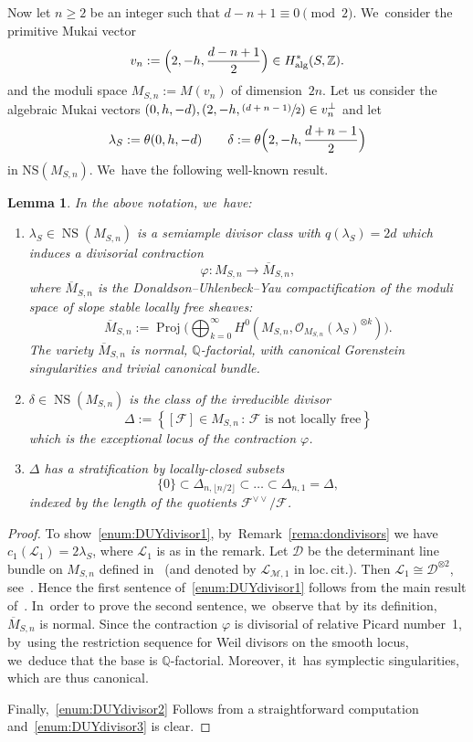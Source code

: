 \documentclass[JEP,XML,SOM,Unicode,published]{cedram}
\newenvironment{enumeratea}
{\bgroup\def\theenumi{\alph{enumi}}\begin{enumerate}}
{\end{enumerate}\egroup}
\newcommand{\psfrac}[2]{\sfrac{(#1)}{#2}}
\newcommand{\QQ}{{\mathbb Q}}\let\Q\QQ
\newcommand{\ZZ}{{\mathbb Z}}\let\Z\ZZ
\newcommand\cD{\mathcal{D}}
\newcommand\cF{\mathcal{F}}
\newcommand\cL{\mathcal{L}}
\newcommand\cM{\mathcal{M}}
\newcommand\cO{\mathcal{O}}
\DeclareMathOperator{\NS}{NS}
\DeclareMathOperator{\Proj}{Proj}
\let\phi\varphi
\newtheorem{lemm}{Lemma}[section]
\theoremstyle{definition}
\begin{document}
Now let $n\geq2$ be an integer such that $d-n+1\equiv 0 \pmod 2$. We~consider the primitive Mukai vector
\begin{equation*}
v_n:=\Bigl(2,-h,\frac{d-n+1}{2}\Bigr)\in H^{*}_\mathrm{alg}(S,\ZZ).
\end{equation*}
and the moduli space $M_{S,n}:=M(v_n)$ of dimension~$2n$.
Let us consider the algebraic Mukai vectors $(0,h,-d),(2,-h,\psfrac{d+n-1}{2})\in v_n^\perp$ and let
\begin{equation}\label{lamdel}
\lambda_S := \theta(0,h,-d) \qquad
\delta:=\theta\Bigl(2,-h,\frac{d+n-1}{2}\Bigr)
\end{equation}
in $\mathrm{NS}(M_{S,n})$. We~have the following well-known result.

\begin{lemm}\label{lem:DUYdivisor}
In the above notation, we~have:
\begin{enumeratea}
\item\label{enum:DUYdivisor1} $\lambda_S\in\NS(M_{S,n})$ is a semiample divisor class with $q(\lambda_S)=2d$ which induces a divisorial contraction
\[
\phi\colon M_{S,n} \to \overline{M}_{S,n},
\]
where $\overline{M}_{S,n}$ is the Donaldson--Uhlenbeck--Yau compactification of the moduli space of slope stable locally free sheaves:
\[
\overline{M}_{S,n}:=\Proj\biggl(\bigoplus_{k=0}^{\infty} H^0(M_{S,n},\cO_{M_{S,n}}(\lambda_S)^{\otimes k})\biggr).
\]
The variety $\overline{M}_{S,n}$ is normal, $\QQ$-factorial, with canonical Gorenstein singularities and trivial canonical bundle.
\item\label{enum:DUYdivisor2} $\delta\in\NS(M_{S,n})$ is the class of the irreducible divisor
\[
\Delta:=\left\{[\cF]\in M_{S,n} \,:\, \text{$\cF$ is not locally free}\right\}
\]
which is the exceptional locus of the contraction $\phi$.
\item\label{enum:DUYdivisor3} $\Delta$ has a stratification by locally-closed subsets
\[
\{ 0 \} \subset \Delta_{n,\lfloor n/2\rfloor} \subset \ldots \subset \Delta_{n,1} = \Delta,
\]
indexed by the length of the quotients $\cF^{\vee\vee}/\cF$.
\end{enumeratea}
\end{lemm}

\begin{proof}
To show~\eqref{enum:DUYdivisor1}, by~Remark~\ref{rema:dondivisors} we have $c_1(\cL_1)=2\lambda_S$, where $\cL_1$ is as in the remark.
Let $\cD$ be the determinant line bundle on $M_{S,n}$ defined in~\cite{Li:uhlencomp} (and denoted by $\cL_{\cM,1}$ in loc.\,cit.).
Then $\cL_1\cong \cD^{\otimes 2}$, see~\cite[Lem.\,8.3.4]{HL:moduli}. Hence the first sentence of~\eqref{enum:DUYdivisor1} follows from the main result of~\cite{Li:uhlencomp}. In~order to prove the second sentence, we~observe that by its definition, $\overline{M}_{S,n}$ is normal.
Since the contraction $\varphi$ is divisorial of relative Picard number~1, by~using the restriction sequence for Weil divisors on the smooth locus, we~deduce that the base is $\Q$-factorial.
Moreover, it~has symplectic singularities, which are thus canonical.

Finally,~\eqref{enum:DUYdivisor2} Follows from a straightforward computation and~\eqref{enum:DUYdivisor3} is clear.
\end{proof}
\end{document}

